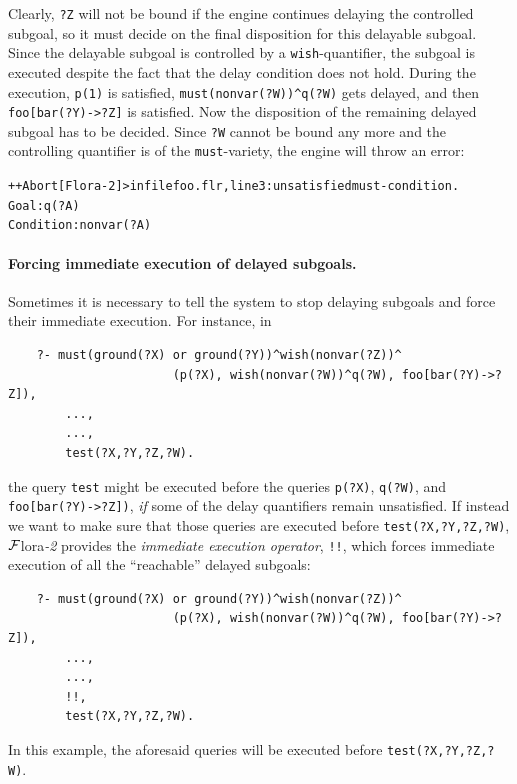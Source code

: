 \documentclass[11pt]{article}
\newcommand{\FLSYSTEM}{{\mbox{\sc ${\cal F}${lora}\rm\emph{-2}}}\xspace}
\newcommand{\errorsystem}{Flora-2}
\newcommand{\flrext}{flr}
\begin{document}
Clearly, \texttt{?Z} will not be bound if the engine continues delaying the
controlled subgoal, so it must decide on the final disposition for this
delayable subgoal. Since the delayable subgoal
is controlled by a \texttt{wish}-quantifier,
the subgoal is executed despite the fact that the delay condition does not
hold. During the execution, \texttt{p(1)} is
satisfied, \texttt{must(nonvar(?W))\^{}q(?W)} gets delayed, and then
\texttt{foo[bar(?Y)->?Z]} is satisfied. 
Now the disposition of the remaining delayed subgoal has to be decided.
Since \texttt{?W} cannot be bound any more and the controlling quantifier
is of the \texttt{must}-variety, the engine will throw an error:
\begin{alltt}
++Abort[\errorsystem]> in file foo.\flrext, line 3: unsatisfied must-condition.
	Goal: q(?A)
	Condition: nonvar(?A)
\end{alltt}

\index{!!}
\paragraph{Forcing immediate execution of delayed subgoals.}
Sometimes it is necessary to tell the system to stop delaying
subgoals and force their immediate execution.
For instance, in
\begin{verbatim}
    ?- must(ground(?X) or ground(?Y))^wish(nonvar(?Z))^
                       (p(?X), wish(nonvar(?W))^q(?W), foo[bar(?Y)->?Z]),
        ...,
        ...,
        test(?X,?Y,?Z,?W).
\end{verbatim}
the query \texttt{test} might be executed before the queries \texttt{p(?X)},
\texttt{q(?W)}, and \texttt{foo[bar(?Y)->?Z])}, \emph{if} some of the
delay quantifiers remain unsatisfied. If instead we want
to make sure that those queries are executed before
\texttt{test(?X,?Y,?Z,?W)}, \FLSYSTEM provides the \emph{immediate execution
operator}, \texttt{!!},
which forces immediate execution of all the ``reachable'' delayed subgoals:
\begin{verbatim}
    ?- must(ground(?X) or ground(?Y))^wish(nonvar(?Z))^
                       (p(?X), wish(nonvar(?W))^q(?W), foo[bar(?Y)->?Z]),
        ...,
        ...,
        !!,
        test(?X,?Y,?Z,?W).
\end{verbatim}
In this example, the aforesaid queries will be executed before
\texttt{test(?X,?Y,?Z,?W)}. 
\end{document}
